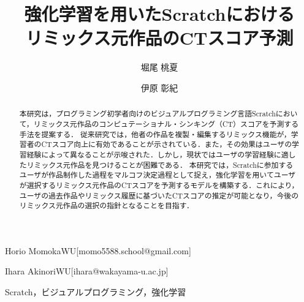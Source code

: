 \documentclass[submit,techrep,noauthor]{ipsj}
\begin{document}
\title{強化学習を用いたScratchにおける\\
リミックス元作品のCTスコア予測}





\author{堀尾 桃夏}{Horio Momoka}{WU}[momo5588.school@gmail.com]
\author{伊原 彰紀}{Ihara Akinori}{WU}[ihara@wakayama-u.ac.jp]

\begin{abstract}
本研究は，プログラミング初学者向けのビジュアルプログラミング言語Scratchにおいて，リミックス元作品のコンピュテーショナル・シンキング（CT）スコアを予測する手法を提案する．
従来研究では，他者の作品を複製・編集するリミックス機能が，学習者のCTスコア向上に有効であることが示されている．また，その効果はユーザの学習経験によって異なることが示唆された．しかし，現状ではユーザの学習経験に適したリミックス元作品を見つけることが困難である．
本研究では，Scratchに参加するユーザが作品制作した過程をマルコフ決定過程として捉え，強化学習を用いてユーザが選択するリミックス元作品のCTスコアを予測するモデルを構築する．これにより，ユーザの過去作品やリミックス履歴に基づいたCTスコアの推定が可能となり，今後のリミックス元作品の選択の指針となることを目指す．
\end{abstract}


%
\begin{jkeyword}
    {Scratch，ビジュアルプログラミング，強化学習}
\end{jkeyword}
%

%

\maketitle
\end{document}
